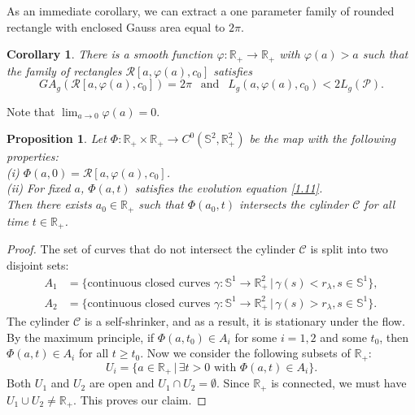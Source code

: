 \documentclass{amsart}
\theoremstyle{Corollary}
\newtheorem{cor}[theorem]{Corollary}
\newtheorem{prop}[theorem]{Proposition}
\numberwithin{equation}{section}
\begin{document}
As an immediate corollary, we can extract a one parameter family of
rounded rectangle with enclosed Gauss area equal to $2\pi$.

\begin{cor}
There is a smooth function $\varphi: \mathbb{R}_+\to\mathbb{R}_+$
with $\varphi(a)>a$ such that the family of rectangles
$\mathcal{R}[a,\varphi(a),c_0]$ satisfies
$$GA_g(\mathcal{R}[a,\varphi(a),c_0])=2\pi~~\mbox{ and }~~
L_g(a,\varphi(a),c_0)<2L_g(\mathcal{P}).$$
\end{cor}

Note that $\displaystyle\lim_{a\to 0}\varphi(a)=0$.



\begin{prop}
  Let $\Phi:\mathbb{R}_+\times\mathbb{R}_+\to C^0(\mathbb{S}^2,\mathbb{R}^2_+)$
be the map with the following properties:\\
(i) $\Phi(a,0)=\mathcal{R}[a,\varphi(a),c_0]$.\\
(ii) For fixed $a$, $\Phi(a,t)$ satisfies the evolution equation \eqref{1.11}.\\
Then there exists $a_0\in\mathbb{R}_+$ such that $\Phi(a_0,t)$ intersects the cylinder $\mathcal{C}$
for all time $t\in\mathbb{R}_+$.
\end{prop}
\begin{proof}
The set of curves that do not intersect the cylinder $\mathcal{C}$ is split into two disjoint sets:
\begin{equation*}
\begin{split}
   A_1&=\Big\{\mbox{continuous closed curves }\gamma:\mathbb{S}^1\to\mathbb{R}^2_+\,|\,\gamma(s)<r_\lambda, s\in\mathbb{S}^1\Big\},\\
   A_2&=\Big\{\mbox{continuous closed curves }\gamma:\mathbb{S}^1\to\mathbb{R}^2_+\,|\,\gamma(s)>r_\lambda, s\in\mathbb{S}^1\Big\}.
\end{split}
\end{equation*}
The cylinder $\mathcal{C}$ is a self-shrinker, and as a result, it is stationary under the flow.
By the maximum principle,
if $\Phi(a,t_0)\in A_i$ for some $i=1,2$ and some $t_0$,
then $\Phi(a,t)\in A_i$ for all $t\geq t_0$.
Now we consider the following subsets of $\mathbb{R}_+$:
$$U_i=\{a\in\mathbb{R}_+\,|\,\exists t>0\mbox{ with }\Phi(a,t)\in A_i\}.$$
Both $U_1$ and $U_2$ are open and $U_1\cap U_2=\emptyset$.
Since $\mathbb{R}_+$ is connected,
we must have $U_1\cup U_2\neq \mathbb{R}_+$.
This proves our claim.
\end{proof}
\end{document}
